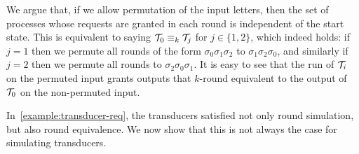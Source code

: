 \begin{example}
We argue that, if we allow permutation of the input letters, then the set of processes whose requests are granted in each round is independent of the start state. This is equivalent to saying $\mathcal{T}_0 \equiv_k \mathcal{T}_j$ for $j\in \{1,2\}$, which indeed holds: if $j=1$ then we permute all rounds of the form $\sigma_0 \sigma_1 \sigma_2$ to $\sigma_1 \sigma_2 \sigma_0$, and similarly if $j=2$ then we permute all rounds to $\sigma_2 \sigma_0 \sigma_1$. It is easy to see that the run of $\mathcal{T}_i$ on the permuted input grants outputs that $k$-round equivalent to the output of $\mathcal{T}_0$ on the non-permuted input.
\end{example}

In~\cref{example:transducer-req}, the transducers satisfied not only round simulation, but also round equivalence. We now show that this is not always the case for simulating transducers.

